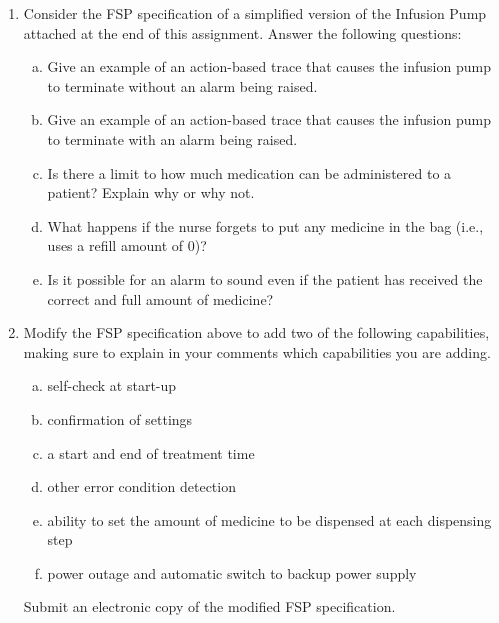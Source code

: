 \documentclass{article}
\begin{document}
\begin{enumerate}[1.]
 \item Consider the FSP specification of a simplified version of the Infusion Pump attached at the end of this assignment.
 Answer the following questions:
    \begin{enumerate}[a.]
    \item Give an example of an action-based trace that causes the infusion pump to terminate without an alarm being raised.
    \item Give an example of an action-based trace that causes the infusion pump to terminate with an alarm being raised.
    \item Is there a limit to how much medication can be administered to a patient? Explain why or why not.
    \item What happens if the nurse forgets to put any medicine in the bag (i.e., uses a refill amount of 0)?
    \item Is it possible for an alarm to sound even if the patient has received the correct and full amount of medicine?
    \end{enumerate}

 \item Modify the FSP specification above to add two of the following capabilities, making sure
 to explain in your comments which capabilities you are adding.
 \begin{enumerate}[a.]
    \item self-check at start-up
    \item confirmation of settings
    \item a start and end of treatment time
    \item other error condition detection
    \item ability to set the amount of medicine to be dispensed at each dispensing step
    \item power outage and automatic switch to backup power supply
    \end{enumerate}
 Submit an electronic copy of the modified FSP specification.
\end{enumerate}

\clearpage
\end{document}

